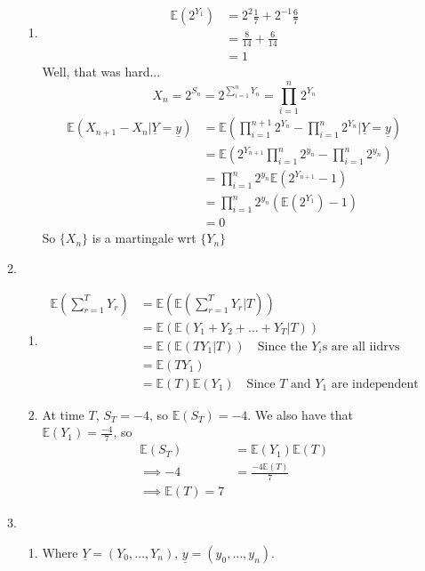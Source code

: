 \documentclass{article}
\begin{document}
\begin{enumerate}
\begin{enumerate}
\begin{enumerate}
\item
\begin{align*}
\mathbb{E}(2^{Y_1}) &= 2^2\frac{1}{7} + 2^{-1}\frac{6}{7}\\
&= \frac{8}{14} + \frac{6}{14}\\
&=1
\end{align*}
Well, that was hard...
$$
X_n = 2^{S_n} = 2^{\sum\limits_{i=1}^n Y_n} = \prod^n_{i=1}2^{Y_n}
$$
\begin{align*}
\mathbb{E}(X_{n+1}-X_n| \underline{Y} = \underline{y})& =
\mathbb{E}(\prod^{n+1}_{i=1}2^{Y_n} - \prod^n_{i=1}2^{Y_n} | \underline{Y} =
\underline{y})\\
&= \mathbb{E}(2^{Y_{n+1}}\prod^{n}_{i=1}2^{y_n} - \prod^n_{i=1}2^{y_n})\\
&= \prod^n_{i=1}2^{y_n} \mathbb{E}(2^{Y_{n+1}}-1)\\
&= \prod^n_{i=1}2^{y_n} (\mathbb{E}(2^{Y_1}) -1)\\
&= 0
\end{align*}
So $\{X_n\}$ is a martingale wrt $\{Y_n\}$

\end{enumerate}
\item
\begin{enumerate}
\item
\begin{align*}
\mathbb{E}(\sum^T_{r=1}Y_r) &= \mathbb{E}(\mathbb{E}(\sum^T_{r=1}Y_r|T))\\
&= \mathbb{E}(\mathbb{E}(Y_1+Y_2+\dots+Y_T|T))\\
&= \mathbb{E}(\mathbb{E}(TY_1|T)) \quad \mbox{Since the $Y_i$s are all
iidrvs}\\&= \mathbb{E}(TY_1)\\
&= \mathbb{E}(T)\mathbb{E}(Y_1) \quad \mbox{Since $T$ and $Y_1$ are
independent}\end{align*}
\item
At time $T$, $S_T = -4$, so $\mathbb{E}(S_T) = -4$. We also have that
$\mathbb{E}(Y_1) = \frac{-4}{7}$, so
\begin{align*}
\mathbb{E}(S_T)&=\mathbb{E}(Y_1)\mathbb{E}(T)\\
\implies -4 &= \frac{-4\mathbb{E}(T)}{7}\\
\implies \mathbb{E}(T) = 7
\end{align*}
\end{enumerate}

\item
\begin{enumerate}
\item
Where $\underline{Y} = (Y_0,\dots,Y_n)$, $\underline{y} = (y_0,\dots,y_n)$.


\end{enumerate}
\end{enumerate}
\end{enumerate}
\end{document}
